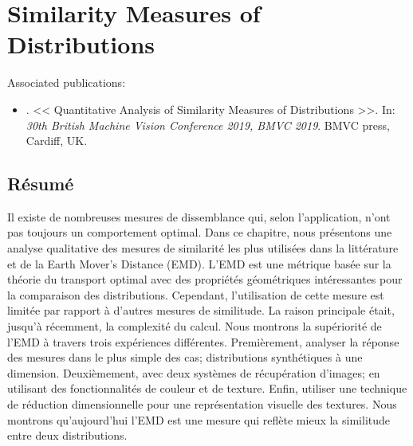 
\chapter{Similarity Measures of Distributions}
Associated publications: \vspace{-2mm}

\begin{itemize}
	\item \citep{Bazan.Dokladal.ea:BMVC:2019}. << Quantitative Analysis of Similarity Measures of
Distributions >>. In: \textit{30th British Machine Vision Conference 2019, BMVC 2019}. BMVC press, Cardiff, UK.
\end{itemize}

\section*{Résumé}
\noindent Il existe de nombreuses mesures de dissemblance qui, selon l'application, n'ont pas toujours un comportement optimal. Dans ce chapitre, nous présentons une analyse qualitative des mesures de similarité les plus utilisées dans la littérature et de la Earth Mover's Distance (EMD). L'EMD est une métrique basée sur la théorie du transport optimal avec des propriétés géométriques intéressantes pour la comparaison des distributions. Cependant, l'utilisation de cette mesure est limitée par rapport à d'autres mesures de similitude. La raison principale était, jusqu'à récemment, la complexité du calcul. Nous montrons la supériorité de l'EMD à travers trois expériences différentes. Premièrement, analyser la réponse des mesures dans le plus simple des cas; distributions synthétiques à une dimension. Deuxièmement, avec deux systèmes de récupération d'images; en utilisant des fonctionnalités de couleur et de texture. Enfin, utiliser une technique de réduction dimensionnelle pour une représentation visuelle des textures. Nous montrons qu'aujourd'hui l'EMD est une mesure qui reflète mieux la similitude entre deux distributions.

